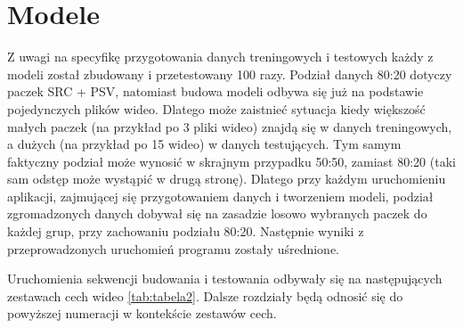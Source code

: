\section{Modele }
\label{cha:drugiDokument}


Z uwagi na specyfikę przygotowania danych treningowych i testowych każdy z modeli został zbudowany i przetestowany 100 razy. Podział danych 80:20 dotyczy paczek SRC + PSV, natomiast budowa modeli odbywa się już na podstawie pojedynczych plików wideo. Dlatego może zaistnieć sytuacja kiedy większość małych paczek (na przykład po 3 pliki wideo) znajdą się w danych treningowych, a dużych (na przykład po 15 wideo) w danych testujących. Tym samym faktyczny podział może wynosić w skrajnym przypadku 50:50, zamiast 80:20 (taki sam odstęp może wystąpić w drugą stronę). Dlatego  przy  każdym uruchomieniu aplikacji, zajmującej się przygotowaniem danych  i tworzeniem modeli, podział zgromadzonych danych dobywał się na zasadzie losowo wybranych paczek do każdej grup, przy zachowaniu podziału 80:20. Następnie wyniki z przeprowadzonych uruchomień programu zostały uśrednione.\par
Uruchomienia sekwencji budowania i testowania odbywały się na następujących zestawach cech wideo \ref{tab:tabela2}. Dalsze rozdziały będą odnosić się do powyższej numeracji w kontekście zestawów cech.


